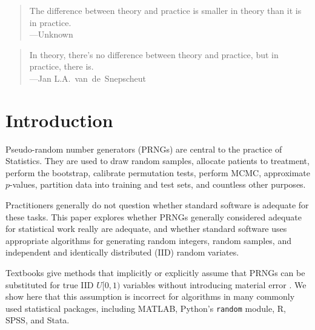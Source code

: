 \documentclass[graybox]{svmult}
\begin{document}

\begin{quotation}
The difference between theory and practice is smaller in theory than it is in practice. \\ ---Unknown
\end{quotation}


\begin{quotation}
In theory, there's no difference between theory and practice, but in practice, there is. \\ ---Jan L.A.~van~de~Snepscheut
\end{quotation}

\section{Introduction}
\label{sec:introduction}


Pseudo-random number generators (PRNGs) are central to the practice of Statistics.
They are used to draw random samples, allocate patients to treatment, perform the bootstrap, 
calibrate permutation tests, perform MCMC, approximate $p$-values, partition data into training and test sets, and countless other purposes.

Practitioners generally do not question whether standard software is adequate for these tasks.
This paper explores whether PRNGs generally considered adequate for statistical work really are
adequate, and whether standard software uses appropriate algorithms for generating random integers, random samples,
and independent and identically distributed (IID) random variates.


Textbooks give methods that implicitly or explicitly assume that PRNGs 
can be substituted for true IID $U[0,1)$ variables without introducing material error 
\cite{stine_statistics_2014, leblanc_statistics_2004, dahlberg_practical_2010, press_numerical_1988, peck_introduction_2011}.
We show here that this assumption is incorrect for algorithms in many commonly used statistical packages,
including MATLAB, Python's \texttt{random} module, R, SPSS, and Stata.
\end{document}
